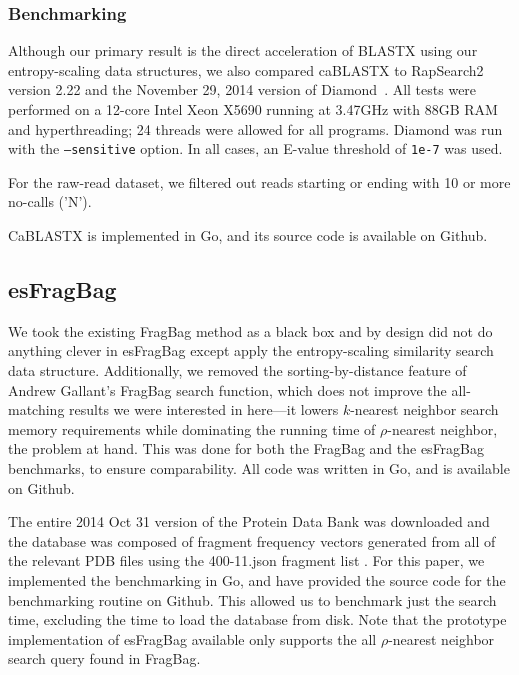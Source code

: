 \documentclass[review,preprint,12pt]{elsarticle}
\renewcommand{\cite}{\citep} %
\theoremstyle{definition}
\theoremstyle{remark}
\begin{document}
\subsubsection{Benchmarking}

Although our primary result is the direct acceleration of BLASTX using our
entropy-scaling data structures, we also compared caBLASTX to 
RapSearch2~\cite{zhao2012rapsearch2} version 2.22 and the November 29, 2014 
version of Diamond~\cite{buchfink2014fast}.
All tests were performed on a 12-core Intel Xeon X5690 running at 3.47GHz with
88GB RAM and hyperthreading; 24 threads were allowed for all programs.
Diamond was run with the \texttt{--sensitive} option.
In all cases, an E-value threshold of \texttt{1e-7} was used.

For the raw-read dataset, we filtered out reads starting or ending with 10 or 
more no-calls ('N').

CaBLASTX is implemented in Go, and its source code is available on Github.

\subsection{esFragBag}
We took the existing FragBag method as a black box and by design did not do anything clever in esFragBag except apply the entropy-scaling similarity search data structure.
Additionally, we removed the sorting-by-distance feature of Andrew Gallant's 
FragBag search function, which does not improve the all-matching results we 
were interested in here---it lowers $k$-nearest neighbor search memory 
requirements while dominating the running time of $\rho$-nearest neighbor, the 
problem at hand.
This was done for both the FragBag and the esFragBag benchmarks, to ensure comparability.
All code was written in Go, and is available on Github.

The entire 2014 Oct 31 version of the Protein Data Bank was downloaded and the 
database was composed of fragment frequency vectors generated from all of the 
relevant PDB files using the 400-11.json fragment list \cite{budowski2010fragbag}.
For this paper, we implemented the benchmarking in Go, and have provided the 
source code for the benchmarking routine on Github.
This allowed us to benchmark just the search time, excluding the time to load the database from disk.
Note that the prototype implementation of esFragBag available only supports the 
all $\rho$-nearest neighbor search query found in FragBag.


%

\end{document}
